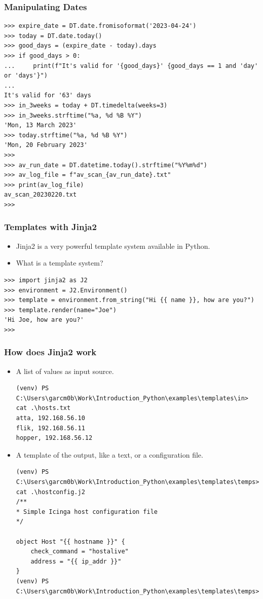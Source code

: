 \documentclass[aspectratio=169]{beamer}
\begin{document}
\begin{frame}[fragile]
\frametitle{Manipulating Dates}

\scriptsize
\begin{verbatim}
>>> expire_date = DT.date.fromisoformat('2023-04-24')
>>> today = DT.date.today()
>>> good_days = (expire_date - today).days
>>> if good_days > 0:
...     print(f"It's valid for '{good_days}' {good_days == 1 and 'day' or 'days'}")
...
It's valid for '63' days
>>> in_3weeks = today + DT.timedelta(weeks=3)
>>> in_3weeks.strftime("%a, %d %B %Y")
'Mon, 13 March 2023'
>>> today.strftime("%a, %d %B %Y")
'Mon, 20 February 2023'
>>>
>>> av_run_date = DT.datetime.today().strftime("%Y%m%d")
>>> av_log_file = f"av_scan_{av_run_date}.txt"
>>> print(av_log_file)
av_scan_20230220.txt
>>>
\end{verbatim}
\end{frame}

\begin{frame}[fragile]
\frametitle{Templates with Jinja2}
\begin{itemize}
    \item Jinja2 is a very powerful template system available in Python. 
    \item What is a template system?
\end{itemize}

\scriptsize
\begin{verbatim}
>>> import jinja2 as J2
>>> environment = J2.Environment()
>>> template = environment.from_string("Hi {{ name }}, how are you?")
>>> template.render(name="Joe")
'Hi Joe, how are you?'
>>>    
\end{verbatim}
\end{frame}

\begin{frame}[fragile]
\frametitle{How does Jinja2 work}
\begin{itemize}
    \item A list of values as input source.
    \tiny
    \begin{verbatim}
(venv) PS C:\Users\garcm0b\Work\Introduction_Python\examples\templates\in> cat .\hosts.txt
atta, 192.168.56.10
flik, 192.168.56.11
hopper, 192.168.56.12        
    \end{verbatim}
    \normalsize
    \item A template of the output, like a text, or a configuration file.
    \tiny
    \begin{verbatim}
(venv) PS C:\Users\garcm0b\Work\Introduction_Python\examples\templates\temps> cat .\hostconfig.j2
/**
* Simple Icinga host configuration file
*/

object Host "{{ hostname }}" {
    check_command = "hostalive"
    address = "{{ ip_addr }}"
}
(venv) PS C:\Users\garcm0b\Work\Introduction_Python\examples\templates\temps>
    \end{verbatim}
    \normalsize
\end{itemize}
\end{frame}
\end{document}
